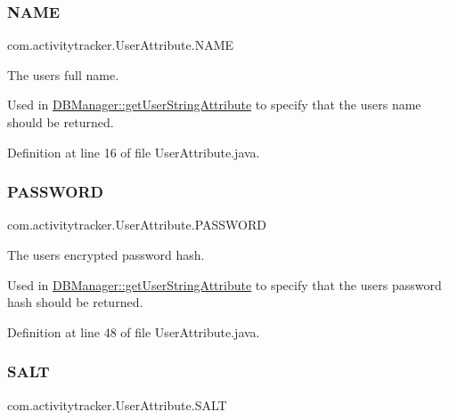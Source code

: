 \subsubsection{\texorpdfstring{N\+A\+ME}{NAME}}
{\footnotesize\ttfamily com.\+activitytracker.\+User\+Attribute.\+N\+A\+ME}

The user\textquotesingle{}s full name.

Used in \mbox{\hyperlink{classcom_1_1activitytracker_1_1_d_b_manager_a20f726c054d6c8a6fc3ce629d87f1114}{D\+B\+Manager\+::get\+User\+String\+Attribute}} to specify that the user\textquotesingle{}s name should be returned. 

Definition at line 16 of file User\+Attribute.\+java.

\mbox{\label{enumcom_1_1activitytracker_1_1_user_attribute_aa893eac0362a28e73a599ce1ba141d40}} 
\subsubsection{\texorpdfstring{P\+A\+S\+S\+W\+O\+RD}{PASSWORD}}
{\footnotesize\ttfamily com.\+activitytracker.\+User\+Attribute.\+P\+A\+S\+S\+W\+O\+RD}

The user\textquotesingle{}s encrypted password hash.

Used in \mbox{\hyperlink{classcom_1_1activitytracker_1_1_d_b_manager_a20f726c054d6c8a6fc3ce629d87f1114}{D\+B\+Manager\+::get\+User\+String\+Attribute}} to specify that the user\textquotesingle{}s password hash should be returned. 

Definition at line 48 of file User\+Attribute.\+java.

\mbox{\label{enumcom_1_1activitytracker_1_1_user_attribute_acd286be9d131a84a2be02e1cdac4c848}} 
\subsubsection{\texorpdfstring{S\+A\+LT}{SALT}}
{\footnotesize\ttfamily com.\+activitytracker.\+User\+Attribute.\+S\+A\+LT}

